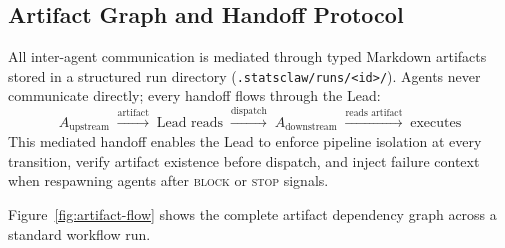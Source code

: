 \subsection{Artifact Graph and Handoff Protocol}
\label{sec:artifacts}

All inter-agent communication is mediated through typed Markdown
artifacts stored in a structured run directory
(\texttt{.statsclaw/runs/<id>/}). Agents never communicate directly;
every handoff flows through the Lead:
\[
  A_{\text{upstream}} \;\xrightarrow{\text{artifact}}\;
  \text{Lead reads} \;\xrightarrow{\text{dispatch}}\;
  A_{\text{downstream}} \;\xrightarrow{\text{reads artifact}}\;
  \text{executes}
\]
This mediated handoff enables the Lead to enforce pipeline isolation
at every transition, verify artifact existence before dispatch, and
inject failure context when respawning agents after \textsc{block}
or \textsc{stop} signals.

Figure~\ref{fig:artifact-flow} shows the complete artifact dependency
graph across a standard workflow run.

